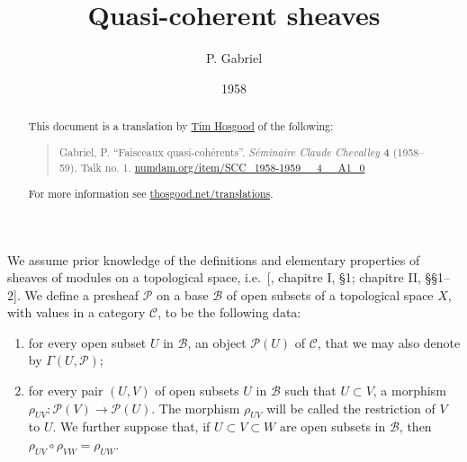 \documentclass[british]{article}
\title{Quasi-coherent sheaves}
\author{P. Gabriel}
\date{1958}
\providecommand{\tightlist}{%
\setlength{\itemsep}{0pt}\setlength{\parskip}{0pt}}
\newcommand{\oldpage}[1]{\marginpar{\footnotesize$\Big\vert$ \textit{p.~#1}}}
\begin{document}
\maketitle
\thispagestyle{fancy}

\setcounter{footnote}{0}

\begin{abstract}
  This document is a translation by \href{https://thosgood.net}{Tim Hosgood} of the following:
  \begin{quote}
    Gabriel, P. ``Faisceaux quasi-cohérents''. \emph{Séminaire Claude
    Chevalley} \textbf{4} (1958--59), Talk no. 1.
    \href{http://www.numdam.org/item/SCC_1958-1959__4__A1_0}{numdam.org/item/SCC\_1958-1959\_\_4\_\_A1\_0}
  \end{quote}
  For more information see \href{https://thosgood.net/translations}{thosgood.net/translations}.
\end{abstract}

\tableofcontents
\bigskip


\providecommand{\scr}[1]{{\mathscr{#1}}}
\renewcommand{\cal}[1]{{\mathcal{#1}}}
\renewcommand{\frak}[1]{{\mathfrak{#1}}}
\renewcommand{\geq}{\geqslant}
\renewcommand{\leq}{\leqslant}

\providecommand{\HH}{\operatorname{H}}
\providecommand{\Hom}{\operatorname{Hom}}
\providecommand{\Ker}{\operatorname{Ker}}
\providecommand{\Coker}{\operatorname{Coker}}

\oldpage{1-01}

We assume prior knowledge of the definitions and elementary properties
of sheaves of modules on a topological space, i.e.~{[}\textcite{2},
chapitre I, §1; chapitre II, §§1--2{]}. We define a presheaf
\({\mathscr{P}}\) on a base \(\mathscr{B}\) of open subsets of a
topological space \(X\), with values in a category \({\mathcal{C}}\), to
be the following data:

\begin{enumerate}
\def\labelenumi{\alph{enumi}.}
\tightlist
\item
  for every open subset \(U\) in \(\mathscr{B}\), an object
  \({\mathscr{P}}(U)\) of \({\mathcal{C}}\), that we may also denote by
  \(\Gamma(U,{\mathscr{P}})\);
\item
  for every pair \((U,V)\) of open subsets \(U\) in \(\mathscr{B}\) such
  that \(U\subset V\), a morphism
  \(\rho_{UV}\colon{\mathscr{P}}(V)\to{\mathscr{P}}(U)\). The morphism
  \(\rho_{UV}\) will be called the restriction of \(V\) to \(U\). We
  further suppose that, if \(U\subset V\subset W\) are open subsets in
  \(\mathscr{B}\), then \(\rho_{UV}\circ\rho_{VW}=\rho_{UW}\).
\end{enumerate}
\end{document}
